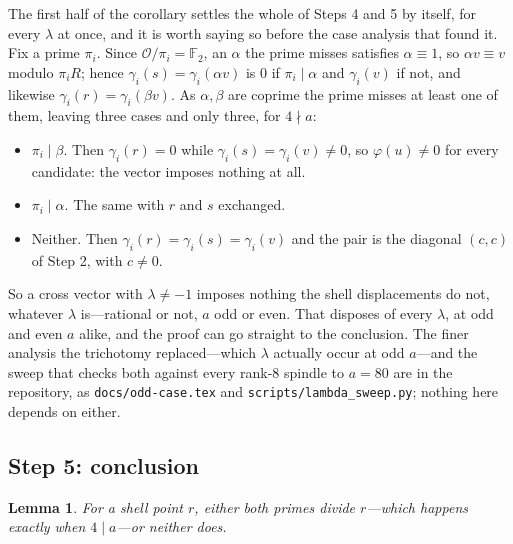 \documentclass[11pt,reqno]{amsart}
\theoremstyle{plain}
\newtheorem{lemma}[theorem]{Lemma}
\theoremstyle{definition}
\newcommand{\F}{\mathbb{F}}
\newcommand{\Lat}{R}
\newcommand{\Ok}{\mathcal{O}}
\begin{document}
The first half of the corollary settles the whole of Steps 4 and 5 by itself, for
every $\lambda$ at once, and it is worth saying so before the case analysis that
found it. Fix a prime $\pi_i$. Since $\Ok/\pi_i = \F_2$, an $\alpha$ the prime
misses satisfies $\alpha \equiv 1$, so $\alpha v \equiv v$ modulo $\pi_i\Lat$;
hence $\gamma_i(s) = \gamma_i(\alpha v)$ is $0$ if $\pi_i \mid \alpha$ and
$\gamma_i(v)$ if not, and likewise $\gamma_i(r) = \gamma_i(\beta v)$. As
$\alpha,\beta$ are coprime the prime misses at least one of them, leaving three
cases and only three, for $4 \nmid a$:
\begin{itemize}
\item $\pi_i \mid \beta$. Then $\gamma_i(r) = 0$ while
      $\gamma_i(s) = \gamma_i(v) \ne 0$, so $\varphi(u) \ne 0$ for every
      candidate: the vector imposes nothing at all.
\item $\pi_i \mid \alpha$. The same with $r$ and $s$ exchanged.
\item Neither. Then $\gamma_i(r) = \gamma_i(s) = \gamma_i(v)$ and the pair is the
      diagonal $(c,c)$ of Step 2, with $c \ne 0$.
\end{itemize}
So a cross vector with $\lambda \ne -1$ imposes nothing the shell displacements do
not, whatever $\lambda$ is---rational or not, $a$ odd or even. That disposes of
every $\lambda$, at odd and even $a$ alike, and the proof can go straight to the
conclusion. The finer analysis the trichotomy replaced---which $\lambda$ actually
occur at odd $a$---and the sweep that checks both against every rank-$8$ spindle
to $a = 80$ are in the repository, as \texttt{docs/odd-case.tex} and
\texttt{scripts/lambda\_sweep.py}; nothing here depends on either.

\subsection*{Step 5: conclusion}

\begin{lemma}\label{lem:D}
For a shell point $r$, either both primes divide $r$---which happens exactly when
$4 \mid a$---or neither does.
\end{lemma}
\end{document}

